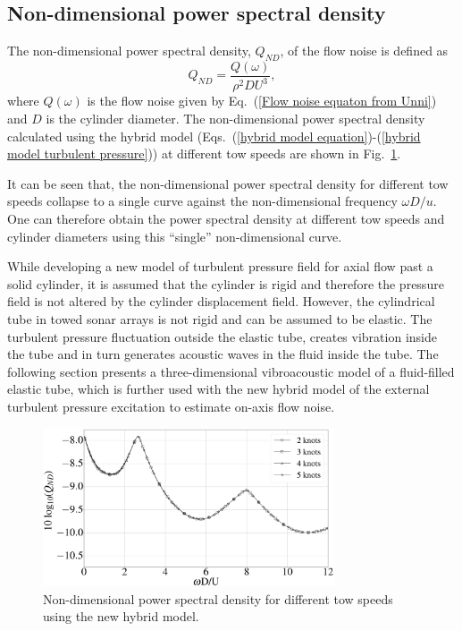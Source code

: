 \documentclass[11pt,cleanfoot]{asme2ej}
\begin{document}
\subsection{Non-dimensional power spectral density}
The non-dimensional power spectral density, $Q_{ND}$, of the flow noise is defined as
\begin{equation}
    Q_{ND} = \frac{Q(\omega)}{\rho^2 D U^3},
\end{equation}
where $Q(\omega)$ is the flow noise given by Eq.~(\ref{Flow noise equaton from Unni}) and $D$ is the cylinder diameter. The non-dimensional power spectral density calculated using the hybrid model (Eqs.~(\ref{hybrid model equation})-(\ref{hybrid model turbulent pressure})) at different tow speeds are shown in Fig.~\ref{non dimensional plot of hybrid model}.

It can be seen that, the non-dimensional power spectral density for different tow speeds collapse to a single curve against the non-dimensional frequency $\omega D/u$. One can therefore obtain the power spectral density at different tow speeds and cylinder diameters using this ``single'' non-dimensional curve.


While developing a new model of turbulent pressure field for axial flow past a solid cylinder, it is assumed that the cylinder is rigid and therefore the pressure field is not altered by the cylinder displacement field. However, the cylindrical tube in towed sonar arrays is not rigid and can be assumed to be elastic. The turbulent pressure fluctuation outside the elastic tube, creates vibration inside the tube and in turn generates acoustic waves in the fluid inside the tube. The following section presents a three-dimensional vibroacoustic model of a fluid-filled elastic tube, which is further used with the new hybrid model of the external turbulent pressure excitation to estimate on-axis flow noise.

\begin{figure}
    \centering
    \includegraphics[width=3.4in]{Non_dimensional_plot_of_hybrid_model.eps}
    \caption{Non-dimensional power spectral density for different tow speeds using the new hybrid model.}
    \label{non dimensional plot of hybrid model}
\end{figure}
\end{document}
